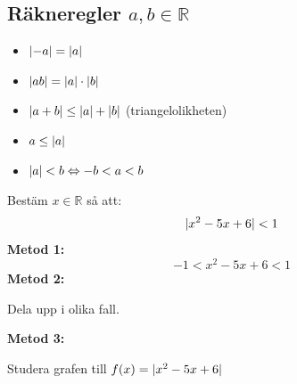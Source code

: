 \subsection{Räkneregler $a,b \in \mathbb{R}$} %
\label{sub:r_kneregler_1}
\begin{itemize}
    \item $\lvert-a\rvert = \lvert a\rvert$
    \item $\lvert ab\rvert = \lvert a\rvert \cdot \lvert b\rvert$
    \item $\lvert a + b\rvert \le \lvert a\rvert + \lvert b\rvert$ (triangelolikheten)
    \item $a \le \lvert a\rvert$
    \item $\lvert a\rvert < b \Leftrightarrow -b < a < b$
\end{itemize}
\begin{Ex}
    Bestäm $x \in \mathbb{R}$ så att:
    \[
    \lvert x^2 - 5x + 6\rvert < 1
    \]
    \textbf{Metod 1:}
    \[
    -1 < x^2  -5x + 6 < 1
    \]
    \textbf{Metod 2:}
    \begin{center}
        Dela upp i olika fall.
    \end{center}
    \textbf{Metod 3:}
    \begin{center}
        Studera grafen till $f(x) = \lvert x^2 - 5x + 6\rvert$
    \end{center}
\end{Ex}
